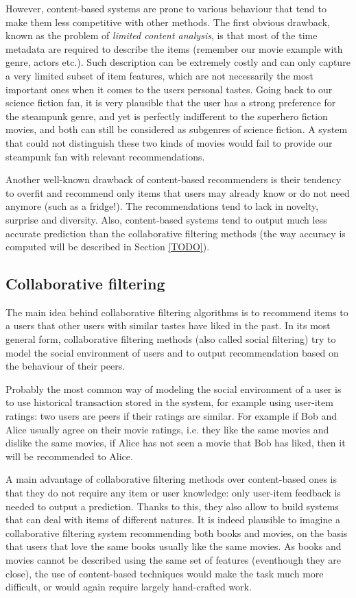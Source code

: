 However, content-based systems are prone to various behaviour that tend to make
them less competitive with other methods. The first obvious drawback, known as
the problem of \textit{limited content analysis}, is that most of the time
metadata are required to describe the items (remember our movie example with
genre, actors etc.). Such description can be extremely costly and can only
capture a very limited subset of item features, which are not necessarily the
most important ones when it comes to the users personal tastes. Going back to
our science fiction fan, it is very plausible that the user has a strong
preference for the steampunk genre, and yet is perfectly indifferent to the
superhero fiction movies, and both can still be considered as subgenres of
science fiction. A system that could not distinguish these two kinds of movies
would fail to provide our steampunk fan with relevant recommendations.

Another well-known drawback of content-based recommenders is their tendency to
overfit and recommend only items that users may already know or do not need
anymore (such as a fridge!). The recommendations tend to lack in novelty,
surprise and diversity. Also, content-based systems tend to output much less
accurate prediction than the collaborative filtering methods (the way accuracy
is computed will be described in Section \ref{TODO}).

\subsection{Collaborative filtering}

The main idea behind collaborative filtering algorithms is to recommend items
to a users that other users with similar tastes have liked in the past. In its
most general form, collaborative filtering methods (also called social
filtering) try to model the social environment of users and to output
recommendation based on the behaviour of their peers.

Probably the most common way of modeling the social environment of a user is to
use historical transaction stored in the system, for example using user-item
ratings: two users are peers if their ratings are similar. For example if Bob
and Alice usually agree on their movie ratings, i.e. they like the same movies
and dislike the same movies, if Alice has not seen a movie that Bob has liked,
then it will be recommended to Alice.

A main advantage of collaborative filtering methods over content-based ones is
that they do not require any item or user knowledge: only user-item feedback is needed
to output a prediction. Thanks to this, they also allow to build systems that
can deal with items of different natures. It is indeed plausible to imagine a
collaborative filtering system recommending both books and movies, on the basis
that users that love the same books usually like the same movies. As books and
movies cannot be described using the same set of features (eventhough they are
close), the use of content-based techniques would make the task much more
difficult, or would again require largely hand-crafted work.

